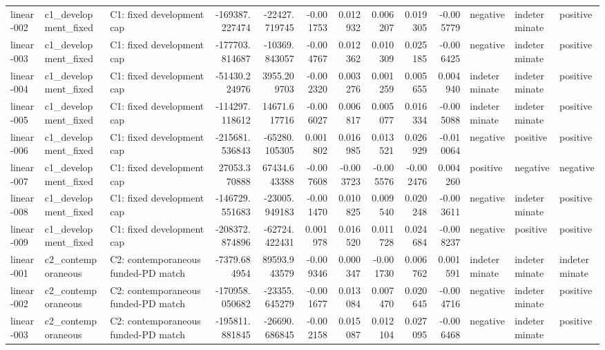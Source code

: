 \begin{tabular}{lllrrrrrrrlll}
linear-002 & c1\_development\_fixed & C1: fixed development cap & -169387.227474 & -22427.719745 & -0.001753 & 0.012932 & 0.006207 & 0.019305 & -0.005779 & negative & indeterminate & positive \\
linear-003 & c1\_development\_fixed & C1: fixed development cap & -177703.814687 & -10369.843057 & -0.004767 & 0.012362 & 0.010309 & 0.025185 & -0.006425 & negative & indeterminate & positive \\
linear-004 & c1\_development\_fixed & C1: fixed development cap & -51430.224976 & 3955.209703 & -0.002320 & 0.003276 & 0.001259 & 0.005655 & 0.004940 & indeterminate & indeterminate & positive \\
linear-005 & c1\_development\_fixed & C1: fixed development cap & -114297.118612 & 14671.617716 & -0.006027 & 0.006817 & 0.005077 & 0.016334 & -0.005088 & indeterminate & indeterminate & positive \\
linear-006 & c1\_development\_fixed & C1: fixed development cap & -215681.536843 & -65280.105305 & 0.001802 & 0.016985 & 0.013521 & 0.026929 & -0.010064 & negative & positive & positive \\
linear-007 & c1\_development\_fixed & C1: fixed development cap & 27053.370888 & 67434.643388 & -0.007608 & -0.003723 & -0.005576 & -0.002476 & 0.004260 & positive & negative & negative \\
linear-008 & c1\_development\_fixed & C1: fixed development cap & -146729.551683 & -23005.949183 & -0.001470 & 0.010825 & 0.009540 & 0.020248 & -0.003611 & negative & indeterminate & positive \\
linear-009 & c1\_development\_fixed & C1: fixed development cap & -208372.874896 & -62724.422431 & 0.001978 & 0.016520 & 0.011728 & 0.024684 & -0.008237 & negative & positive & positive \\
linear-001 & c2\_contemporaneous & C2: contemporaneous funded-PD match & -7379.684954 & 89593.943579 & -0.009346 & 0.000347 & -0.001730 & 0.006762 & 0.001591 & indeterminate & indeterminate & indeterminate \\
linear-002 & c2\_contemporaneous & C2: contemporaneous funded-PD match & -170958.050682 & -23355.645279 & -0.001677 & 0.013084 & 0.007470 & 0.020645 & -0.004716 & negative & indeterminate & positive \\
linear-003 & c2\_contemporaneous & C2: contemporaneous funded-PD match & -195811.881845 & -26690.686845 & -0.002158 & 0.015087 & 0.012104 & 0.027095 & -0.006468 & negative & indeterminate & positive \\

\end{tabular}
